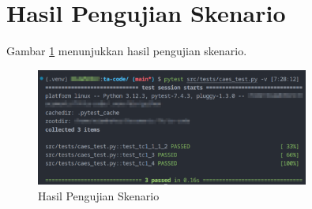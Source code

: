 \section{Hasil Pengujian Skenario}

Gambar \ref{fig:skenario} menunjukkan hasil pengujian skenario.

\begin{figure}[h]
  \centering
  \includegraphics[width=0.8\textwidth]{chapters/res/appendix-3/result.png}
  \caption{Hasil Pengujian Skenario}
  \label{fig:skenario}
\end{figure}